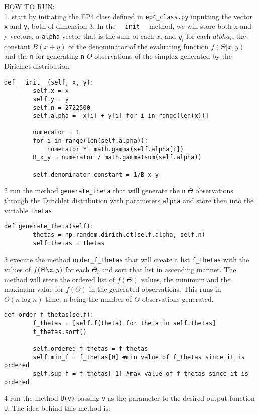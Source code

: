 \documentclass[12pt]{article}
\begin{document}
HOW TO RUN:\\
1. start by initiating the EP4 class defined in \texttt{ep4\_class.py} inputting the vector \texttt{x} and \texttt{y}, both of dimension 3. In the \texttt{\_\_init\_\_} method, we will store both x and y vectors, a \texttt{alpha} vector that is the sum of each $x_i$ and $y_i$ for each $alpha_i$, the constant $B(x + y)$ of the denominator of the evaluating function $f(\Theta|x, y)$ and the \texttt{n} for generating \texttt{n} $\Theta$ observations of the simplex generated by the Dirichlet distribution.\\
\begin{lstlisting}
def __init__(self, x, y):
		self.x = x
		self.y = y
		self.n = 2722500
		self.alpha = [x[i] + y[i] for i in range(len(x))]

		numerator = 1
		for i in range(len(self.alpha)):
			numerator *= math.gamma(self.alpha[i])
		B_x_y = numerator / math.gamma(sum(self.alpha))

		self.denominator_constant = 1/B_x_y
\end{lstlisting}
2 run the method \texttt{generate\_theta} that will generate the \texttt{n} $\Theta$ observations through the Dirichlet distribution with parameters \texttt{alpha} and store then into the variable \texttt{thetas}.\\
\begin{lstlisting}
def generate_theta(self):
		thetas = np.random.dirichlet(self.alpha, self.n)
		self.thetas = thetas
\end{lstlisting}
3 execute the method \texttt{order\_f\_thetas} that will create a list \texttt{f\_thetas} with the values of $f(\Theta\x, y)$ for each $\Theta_i$ and sort that list in ascending manner. The method will store the ordered list of $f(\Theta)$ values, the minimum and the maximum value for $f(\Theta)$ in the generated observations. This runs in $O(n \log n)$ time, n being the number of $\Theta$ observations generated.
\begin{lstlisting}
def order_f_thetas(self):
		f_thetas = [self.f(theta) for theta in self.thetas]
		f_thetas.sort()

		self.ordered_f_thetas = f_thetas
		self.min_f = f_thetas[0] #min value of f_thetas since it is ordered
		self.sup_f = f_thetas[-1] #max value of f_thetas since it is ordered

\end{lstlisting}
4 run the method \texttt{U(v)} passing \texttt{v} as the parameter to the desired output function \texttt{U}. The idea behind this method is:\\
\end{document}
